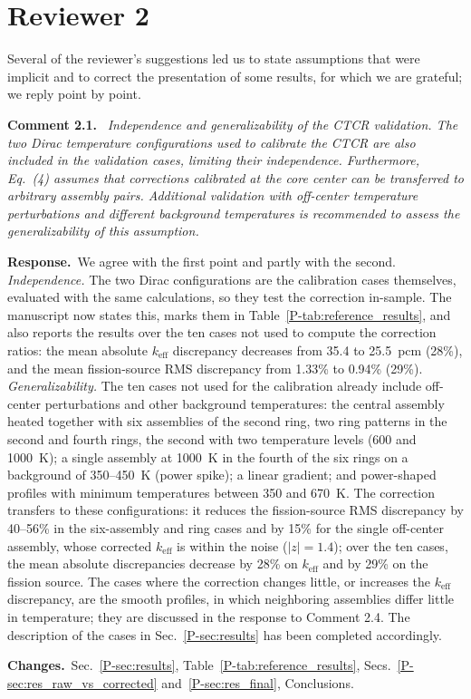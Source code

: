 \documentclass[11pt]{article}
\newenvironment{revcomment}[1]
  {\par\medskip\noindent\textbf{Comment #1.}\ \itshape}
  {\par}
\newcommand{\response}{\par\noindent\textbf{Response.}\ }
\newcommand{\changes}{\par\noindent\textbf{Changes.}\ }
\begin{document}
\section*{Reviewer 2}

Several of the reviewer's suggestions led us to state assumptions that were implicit and to correct the presentation of some results, for which we are grateful; we reply point by point.

\begin{revcomment}{2.1}
Independence and generalizability of the CTCR validation. The two Dirac temperature configurations used to calibrate the CTCR are also included in the validation cases, limiting their independence. Furthermore, Eq.~(4) assumes that corrections calibrated at the core center can be transferred to arbitrary assembly pairs. Additional validation with off-center temperature perturbations and different background temperatures is recommended to assess the generalizability of this assumption.
\end{revcomment}
\response We agree with the first point and partly with the second.
\emph{Independence.} The two Dirac configurations are the calibration cases themselves, evaluated with the same calculations, so they test the correction in-sample. The manuscript now states this, marks them in Table~\ref{P-tab:reference_results}, and also reports the results over the ten cases not used to compute the correction ratios: the mean absolute $k_{\text{eff}}$ discrepancy decreases from 35.4 to 25.5~pcm (28\%), and the mean fission-source RMS discrepancy from 1.33\% to 0.94\% (29\%).
\emph{Generalizability.} The ten cases not used for the calibration already include off-center perturbations and other background temperatures: the central assembly heated together with six assemblies of the second ring, two ring patterns in the second and fourth rings, the second with two temperature levels (600 and 1000~K); a single assembly at 1000~K in the fourth of the six rings on a background of 350--450~K (power spike); a linear gradient; and power-shaped profiles with minimum temperatures between 350 and 670~K. The correction transfers to these configurations: it reduces the fission-source RMS discrepancy by 40--56\% in the six-assembly and ring cases and by 15\% for the single off-center assembly, whose corrected $k_{\text{eff}}$ is within the noise ($|z|=1.4$); over the ten cases, the mean absolute discrepancies decrease by 28\% on $k_{\text{eff}}$ and by 29\% on the fission source. The cases where the correction changes little, or increases the $k_{\text{eff}}$ discrepancy, are the smooth profiles, in which neighboring assemblies differ little in temperature; they are discussed in the response to Comment 2.4. The description of the cases in Sec.~\ref{P-sec:results} has been completed accordingly.
\changes Sec.~\ref{P-sec:results}, Table~\ref{P-tab:reference_results}, Secs.~\ref{P-sec:res_raw_vs_corrected} and~\ref{P-sec:res_final}, Conclusions.
\end{document}
